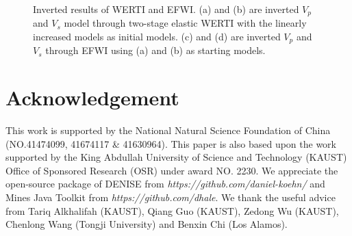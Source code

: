 \begin{figure}[!htb]
   \centering
   \\
   \\
   \\
   \caption{Inverted results of WERTI and EFWI. (a) and (b) are inverted $V_p$ and
	   $V_s$ model through two-stage elastic WERTI with the linearly increased models
	   as initial models. (c) and (d) are inverted $V_p$ and $V_s$ through EFWI using
   (a) and (b) as starting models.}
   \label{fig:InvertedModel}
\end{figure}
\section{Acknowledgement}
This work is supported by the
National Natural Science Foundation of China (NO.41474099, 41674117 \& 41630964). 
This paper is also based upon the work supported by the King Abdullah University of Science
and Technology (KAUST) Office of Sponsored Research (OSR) under award NO. 2230.
We appreciate the open-source package of DENISE from
\textit{https://github.com/daniel-koehn/} and Mines Java Toolkit from
\textit{https://github.com/dhale}.
We thank the useful advice from Tariq Alkhalifah (KAUST), Qiang Guo (KAUST), Zedong Wu (KAUST),
Chenlong Wang (Tongji University) and Benxin Chi (Los Alamos).



